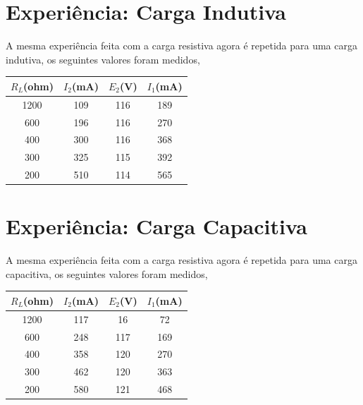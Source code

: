 \documentclass[paper=a4, fontsize=11pt]{article}
\begin{document}
\section{Experiência: Carga Indutiva}

A mesma experiência feita com a carga resistiva agora é repetida para uma carga
indutiva, os seguintes valores foram medidos,

\renewcommand{\arraystretch}{1.5}
\begin{center}

    \begin{tabular}{c||c||c||c}
        $R_L$(ohm) & $I_2$(mA) & $E_2$(V) & $I_1$(mA) \\
        \hline
        1200 & 109 & 116 & 189 \\
        600 & 196 & 116 & 270 \\
        400 & 300 & 116 & 368 \\
        300 & 325 & 115 & 392 \\
        200 & 510 & 114 & 565 \\
    \end{tabular}
\end{center}


\section{Experiência: Carga Capacitiva}

A mesma experiência feita com a carga resistiva agora é repetida para uma carga
capacitiva, os seguintes valores foram medidos,

\renewcommand{\arraystretch}{1.5}
\begin{center}

    \begin{tabular}{c||c||c||c}
        $R_L$(ohm) & $I_2$(mA) & $E_2$(V) & $I_1$(mA) \\
        \hline
        1200 & 117 & 16 & 72 \\
        600 & 248 & 117 & 169 \\
        400 & 358 & 120 & 270 \\
        300 & 462 & 120 & 363 \\
        200 & 580 & 121 & 468 \\
    \end{tabular}
\end{center}
\end{document}
